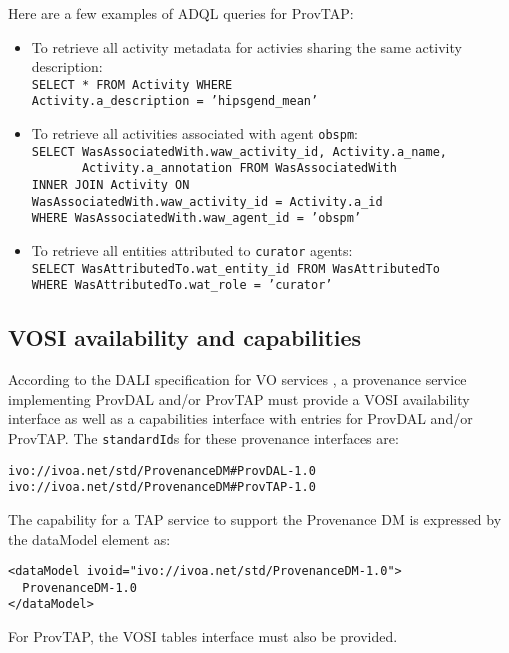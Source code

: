 Here are a few examples of ADQL queries for ProvTAP:
\begin{itemize}
\item To retrieve all activity metadata for activies sharing the same activity description: \\
\texttt{SELECT * FROM  Activity WHERE \\
  Activity.a\_description = 'hipsgend\_mean'}
\item To retrieve all activities associated with agent \texttt{obspm}: \\
\texttt{SELECT WasAssociatedWith.waw\_activity\_id, Activity.a\_name, \\}
\verb!       !\texttt{Activity.a\_annotation FROM WasAssociatedWith \\
INNER JOIN Activity ON \\ WasAssociatedWith.waw\_activity\_id = Activity.a\_id
\\ WHERE  WasAssociatedWith.waw\_agent\_id = 'obspm'}
\item To retrieve all entities attributed to \texttt{curator} agents: \\
\texttt{SELECT  WasAttributedTo.wat\_entity\_id FROM WasAttributedTo \\
 WHERE WasAttributedTo.wat\_role = 'curator'}
\end{itemize}


\subsection{VOSI availability and capabilities}
According to the DALI specification for VO services \citep{std:DALI}, a provenance service implementing ProvDAL and/or ProvTAP must provide a VOSI availability interface as well as a capabilities interface with entries for ProvDAL and/or ProvTAP. The \texttt{standardId}s for these provenance interfaces are:

\begin{verbatim}
ivo://ivoa.net/std/ProvenanceDM#ProvDAL-1.0
ivo://ivoa.net/std/ProvenanceDM#ProvTAP-1.0
\end{verbatim}

The capability for a TAP service to support the Provenance DM is expressed by
the dataModel element as:
\begin{verbatim}
<dataModel ivoid="ivo://ivoa.net/std/ProvenanceDM-1.0">
  ProvenanceDM-1.0
</dataModel>
\end{verbatim}

For ProvTAP, the VOSI tables interface must also be provided.

